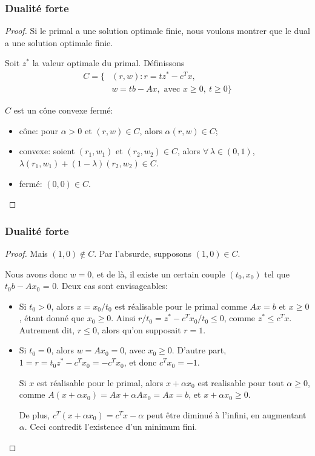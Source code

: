 \documentclass[usepdftitle=false]{beamer}
\begin{document}
\begin{frame}
\frametitle{Dualité forte}

\begin{proof}
Si le primal a une solution optimale finie, nous voulons montrer que le dual a une solution optimale finie.

\mbox{}

Soit $z^*$ la valeur optimale du primal. Définissons
\begin{align*}
C = \lbrace & (r, w): r = tz^* - c^Tx,\\
& w = tb-Ax, \mbox{ avec } x \geq 0,\ t \geq 0 \rbrace
\end{align*}

\mbox{}

$C$ est un cône convexe fermé:
\begin{itemize}
\item
cône: pour $\alpha > 0$ et $(r,w) \in C$, alors $\alpha(r,w) \in C$;
\item
convexe: soient $(r_1, w_1)$ et $(r_2, w_2) \in C$, alors $\forall\, \lambda \in (0,1)$, $\lambda(r_1, w_1) + (1 -\lambda) (r_2, w_2) \in C$.
\item
fermé: $(0,0) \in C$.
\end{itemize}

\end{proof}

\end{frame}

\begin{frame}
\frametitle{Dualité forte}

\begin{proof}

Mais $(1,0) \notin C$. Par l'absurde, supposons $(1,0) \in C$.

Nous avons donc $w = 0$, et de là, il existe un certain couple $(t_0, x_0)$ tel que $t_0b - Ax_0$ = 0. Deux cas sont envisageables:
\begin{itemize}
\item
Si $t_0 > 0$, alors
$x = x_0/t_0$ est réalisable pour le primal comme $Ax = b$ et $x \geq 0$, étant donné que $x_0 \geq 0$.
Ainsi $r/t_0 = z^* - c^Tx_0/t_0 \leq 0$, comme $z^* \leq c^Tx$. Autrement dit, $r \leq 0$, alors qu'on supposait $r = 1$.
\item
Si $t_0 = 0$, alors $w = Ax_0 = 0$, avec $x_0 \geq 0$.
D'autre part, $1 = r = t_0z^* - c^Tx_0 = -c^Tx_0$, et donc $c^T x_0 = -1$.

Si $x$ est réalisable pour le primal, alors $x+\alpha x_0$ est realisable pour tout $\alpha \geq 0$, comme $A(x+\alpha x_0) = Ax + \alpha A x_0 = Ax = b$, et $x+\alpha x_0 \geq 0$.

De plus, $c^T(x+\alpha x_0) = c^Tx - \alpha$ peut être diminué à l'infini, en augmentant $\alpha$. Ceci contredit l'existence d'un minimum fini.
\end{itemize}

\end{proof}

\end{frame}
\end{document}
